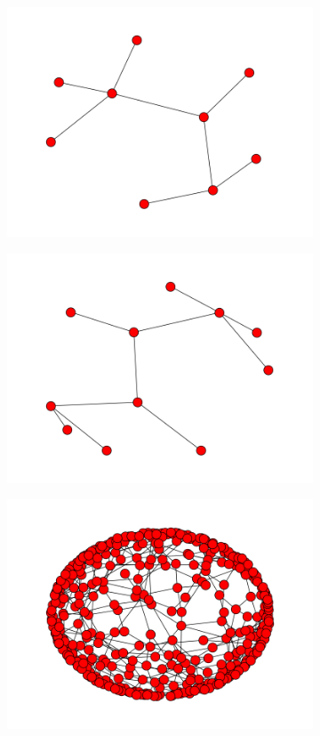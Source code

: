 \documentclass[12pt]{article}
\begin{document}
\begin{figure}[H]
  \begin{subfigure}[b]{0.333\textwidth}
    \includegraphics[scale=0.3]{cluster1.png}      
  \end{subfigure}
  \begin{subfigure}[b]{0.333\textwidth}
    \includegraphics[scale=0.3]{cluster3.png}  
  \end{subfigure}
  \begin{subfigure}[b]{0.333\textwidth}
    \includegraphics[scale=0.3]{cluster2.png}  

\end{subfigure}
\end{figure}
\end{document}
